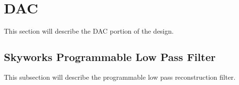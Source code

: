 \section{DAC} %
    This section will describe the DAC portion of the design.
    
    \subsection{Skyworks Programmable Low Pass Filter} %
        This subsection will describe the programmable low pass reconstruction filter.
